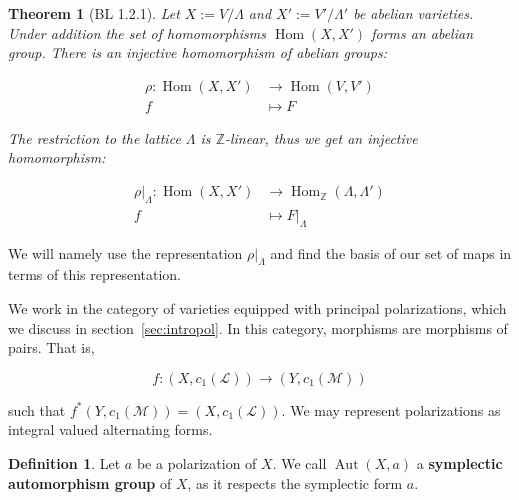 \documentclass[12pt,reqno]{amsart}
\DeclareMathOperator{\Aut}{Aut}
\DeclareMathOperator{\Hom}{Hom}
\newcommand{\Z}{\mathbb{Z}}
\newcommand{\mc}{\mathcal}
\newtheorem*{thm*}{Theorem}
\theoremstyle{definition}
\newtheorem{defn}{Definition}
\theoremstyle{remark}
\begin{document}



\begin{thm*}[BL 1.2.1] Let $X:= V/\Lambda$ and $X':= V'/\Lambda'$ be abelian varieties. Under addition the set of homomorphisms $\Hom(X, X')$ forms an abelian group. There is an injective homomorphism of abelian groups: 


\begin{align*} 
\rho: \Hom(X, X') &\to \Hom(V, V') \\
f &\mapsto F
\end{align*} 

The restriction to the lattice $\Lambda$ is $\Z$-linear, thus we get an injective homomorphism: 


\begin{align*} 
\rho|_{\Lambda}: \Hom(X, X') &\to \Hom_{\Z}(\Lambda, \Lambda') \\
f &\mapsto F|_{\Lambda}
\end{align*} 


\end{thm*}

We will namely use the representation $\rho|_{\Lambda}$ and find the basis of our set of maps in terms of this representation. 

We work in the category of varieties equipped with principal polarizations, which we discuss in section~\ref{sec:intropol}. In this category, morphisms are morphisms of pairs. That is,

$$f: (X, c_1(\mc{L})) \to (Y, c_1(\mc{M}))$$

such that $f^*(Y, c_1(\mc{M})) = (X, c_1(\mc{L}))$.  We may represent polarizations as integral valued alternating forms. 



\begin{defn} Let $a$ be a polarization of $X$. We call $\Aut(X, a)$ a \textbf{symplectic automorphism group} of $X$, as it respects the symplectic form $a$. 
\end{defn}

\end{document}
